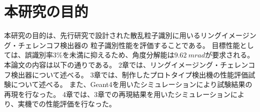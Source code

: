 \section{本研究の目的}
本研究の目的は、先行研究\cite{ref4}で設計された散乱粒子識別に用いるリングイメージング・チェレンコフ検出器の
粒子識別性能を評価することである。
目標性能としては、誤識別率3\%を未満に抑えるため、角度分解能は$\SI{9.62}{mrad}$が要求される。
本論文の内容は以下の通りである。
2章では、リングイメージング・チェレンコフ検出器について述べる。
3章では、制作したプロトタイプ検出機の性能評価試験について述べる。
また、Geant4を用いたシミュレーションにより試験結果の再現を行なった。
4章では、3章での再現結果を用いたシミュレーションにより、実機での性能評価を行なった。
